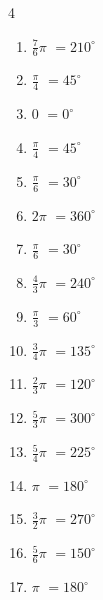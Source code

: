 \begin{multicols}{4}
\begin{enumerate}
  \item $\displaystyle \frac{7}{6}\pi$
        $\displaystyle =210^{\circ}$

  \item $\displaystyle \frac{\pi}{4}$
        $\displaystyle =45^{\circ}$

  \item $\displaystyle 0$
        $\displaystyle =0^{\circ}$

  \item $\displaystyle \frac{\pi}{4}$
        $\displaystyle =45^{\circ}$

  \item $\displaystyle \frac{\pi}{6}$
        $\displaystyle =30^{\circ}$

  \item $\displaystyle 2\pi$
        $\displaystyle =360^{\circ}$

  \item $\displaystyle \frac{\pi}{6}$
        $\displaystyle =30^{\circ}$

  \item $\displaystyle \frac{4}{3}\pi$
        $\displaystyle =240^{\circ}$

  \item $\displaystyle \frac{\pi}{3}$
        $\displaystyle =60^{\circ}$

  \item $\displaystyle \frac{3}{4}\pi$
        $\displaystyle =135^{\circ}$

  \item $\displaystyle \frac{2}{3}\pi$
        $\displaystyle =120^{\circ}$

  \item $\displaystyle \frac{5}{3}\pi$
        $\displaystyle =300^{\circ}$

\columnbreak %

  \item $\displaystyle \frac{5}{4}\pi$
        $\displaystyle =225^{\circ}$

  \item $\displaystyle \pi$
        $\displaystyle =180^{\circ}$

  \item $\displaystyle \frac{3}{2}\pi$
        $\displaystyle =270^{\circ}$

  \item $\displaystyle \frac{5}{6}\pi$
        $\displaystyle =150^{\circ}$

  \item $\displaystyle \pi$
        $\displaystyle =180^{\circ}$


\end{enumerate}
\end{multicols}
